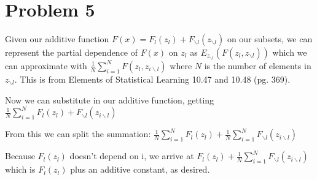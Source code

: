 \documentclass[11pt]{article}
\begin{document}
\begin{center}

\ \\
\end{center}


\section*{Problem 5}

\vspace{5 mm}
\noindent
Given our additive function $F(x) = F_{l}(z_{l}) + F_{\backslash l}(z_{\backslash l})$
 on our subsets, we can represent the partial dependence of $F(x)$ on $z_{l}$ as
  $E_{z_{\backslash l}}(F(z_{l}, z_{\backslash l}))$ which we can approximate with 
  $\frac{1}{N} \sum\limits_{i=1}^N F(z_{l}, z_{i\backslash l})$ where $N$ is the
   number of elements in $z_{\backslash l}$.  This is from Elements of Statistical
    Learning 10.47 and 10.48 (pg. 369).  

\noindent
Now we can substitute in our additive function, getting 
$\frac{1}{N} \sum\limits_{i=1}^N F_{l}(z_{l}) + F_{\backslash l}(z_{i\backslash l})$  

\noindent
From this we can split the summation: 
$\frac{1}{N} \sum\limits_{i=1}^N F_{l}(z_{l}) + \frac{1}{N} \sum\limits_{i=1}^N 
F_{\backslash l}(z_{i\backslash l})$ 

\noindent
Because $F_{l}(z_{l})$ doesn't depend on i, we arrive at $F_{l}(z_{l}) + \frac{1}{N}
 \sum\limits_{i=1}^N F_{\backslash l}(z_{i\backslash l})$ which is $F_{l}(z_{l})$ 
 plus an additive constant, as desired.
\end{document}
